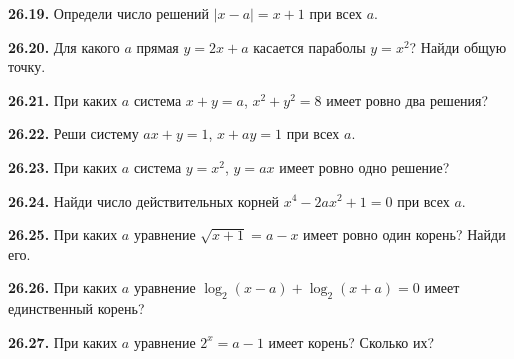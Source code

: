 \noindent\begin{minipage}[t]{\linewidth}\textbf{26.19.}\starmark{} Определи число решений \(|x-a|=x+1\) при всех \(a\).\par\end{minipage}\par
\noindent\begin{minipage}[t]{\linewidth}\textbf{26.20.} Для какого \(a\) прямая \(y=2x+a\) касается параболы \(y=x^2\)? Найди общую точку.\par\end{minipage}\par
\noindent\begin{minipage}[t]{\linewidth}\textbf{26.21.}\starmark{} При каких \(a\) система \(x+y=a\), \(x^2+y^2=8\) имеет ровно два решения?\par\end{minipage}\par
\noindent\begin{minipage}[t]{\linewidth}\textbf{26.22.}\starmark{} Реши систему \(ax+y=1\), \(x+ay=1\) при всех \(a\).\par\end{minipage}\par
\noindent\begin{minipage}[t]{\linewidth}\textbf{26.23.} При каких \(a\) система \(y=x^2\), \(y=ax\) имеет ровно одно решение?\par\end{minipage}\par
\noindent\begin{minipage}[t]{\linewidth}\textbf{26.24.}\starmark{} Найди число действительных корней \(x^4-2ax^2+1=0\) при всех \(a\).\par\end{minipage}\par
\noindent\begin{minipage}[t]{\linewidth}\textbf{26.25.}\starmark{} При каких \(a\) уравнение \(\sqrt{x+1}=a-x\) имеет ровно один корень? Найди его.\par\end{minipage}\par
\noindent\begin{minipage}[t]{\linewidth}\textbf{26.26.}\starmark{} При каких \(a\) уравнение \(\log_2(x-a)+\log_2(x+a)=0\) имеет единственный корень?\par\end{minipage}\par
\noindent\begin{minipage}[t]{\linewidth}\textbf{26.27.} При каких \(a\) уравнение \(2^x=a-1\) имеет корень? Сколько их?\par\end{minipage}\par
